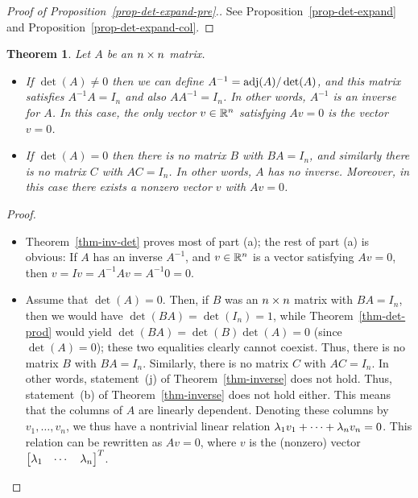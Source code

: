 \documentclass[reqno]{amsart}
\newtheorem{theorem}{Theorem}[section]
\theoremstyle{definition}
\begin{document}
\begin{proof}[Proof of Proposition~\ref{prop-det-expand-pre}.]
 See Proposition~\ref{prop-det-expand}
 and Proposition~\ref{prop-det-expand-col}.
\end{proof}

\begin{theorem}\label{thm-inv-det-pre}
 Let $A$ be an $n\times n$ matrix.  
 \begin{itemize}
  \item[(a)] If $\det(A)\neq 0$ then we can define
   $A^{-1}=\operatorname{adj}(A)/\det(A)$, and this matrix satisfies $A^{-1}A=I_n$
   and also $AA^{-1}=I_n$.  In other words, $A^{-1}$ is an inverse for
   $A$.  In this case, the only vector $v\in{\mathbb{R}}^n$ satisfying $Av=0$ is
   the vector $v=0$.
  \item[(b)] If $\det(A)=0$ then there is no matrix $B$ with $BA=I_n$,
   and similarly there is no matrix $C$ with $AC=I_n$.  In other
   words, $A$ has no inverse.  Moreover, in this case there exists a
   nonzero vector $v$ with $Av=0$.
 \end{itemize}
\end{theorem}
\begin{proof}
\begin{itemize}
\item[(a)]
 Theorem~\ref{thm-inv-det} proves most of part (a);
 the rest of part (a) is obvious:
 If $A$ has an inverse $A^{-1}$, and $v\in{\mathbb{R}}^n$ is a vector satisfying
 $Av = 0$, then $v = Iv = A^{-1}Av = A^{-1}0 = 0$.

\item[(b)]
 Assume that $\det(A)=0$.
 Then, if $B$ was an $n\times n$ matrix with $BA=I_n$,
 then we would have $\det(BA) = \det(I_n) = 1$,
 while Theorem~\ref{thm-det-prod} would yield
 $\det(BA) = \det(B) \det(A) = 0$ (since $\det(A) = 0$);
 these two equalities clearly cannot coexist.
 Thus, there is no matrix $B$ with $BA = I_n$.
 Similarly, there is no matrix $C$ with $AC = I_n$.
 In other words, statement~(j) of Theorem~\ref{thm-inverse}
 does not hold.
 Thus, statement~(b) of Theorem~\ref{thm-inverse} does
 not hold either.
 This means that the columns of $A$ are linearly dependent.
 Denoting these columns by $v_1, \dotsc, v_n$,
 we thus have a nontrivial linear relation
 $\lambda_1 v_1 + \cdots + \lambda_n v_n = 0$.
 This relation can be rewritten as $Av = 0$,
 where $v$ is the (nonzero) vector
 $\begin{bmatrix} \lambda_1 & \cdots & \lambda_n \end{bmatrix}^T$.
 \qedhere
\end{itemize}
\end{proof}
\end{document}
